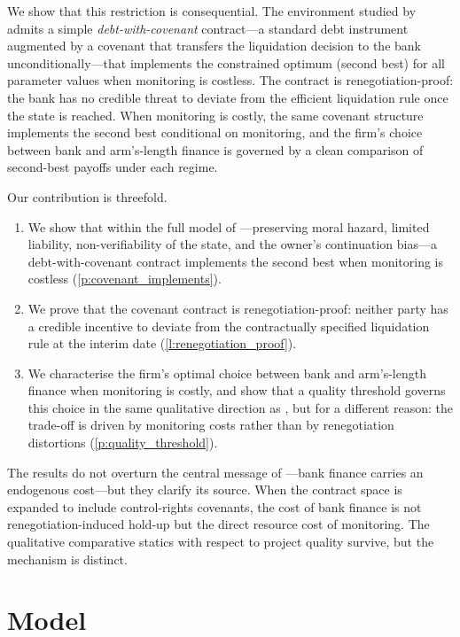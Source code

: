 \documentclass[12pt,a4paper]{article}
\theoremstyle{plain}
\theoremstyle{definition}
\theoremstyle{remark}
\begin{document}
We show that this restriction is consequential. The environment studied by
\citet{Rajan1992} admits a simple \emph{debt-with-covenant} contract---a standard
debt instrument augmented by a covenant that transfers the liquidation decision to the
bank unconditionally---that implements the constrained optimum (second best) for all
parameter values when monitoring is costless. The contract is renegotiation-proof: the
bank has no credible threat to deviate from the efficient liquidation rule once the state
is reached. When monitoring is costly, the same covenant structure implements the
second best conditional on monitoring, and the firm's choice between bank and
arm's-length finance is governed by a clean comparison of second-best payoffs under
each regime.

Our contribution is threefold.
\begin{enumerate}[nosep]
\item We show that within the full model of \citet{Rajan1992}---preserving moral
  hazard, limited liability, non-verifiability of the state, and the owner's
  continuation bias---a debt-with-covenant contract implements the second best when
  monitoring is costless (\cref{p:covenant_implements}).
\item We prove that the covenant contract is renegotiation-proof: neither party has a
  credible incentive to deviate from the contractually specified liquidation rule at
  the interim date (\cref{l:renegotiation_proof}).
\item We characterise the firm's optimal choice between bank and arm's-length finance
  when monitoring is costly, and show that a quality threshold governs this choice in
  the same qualitative direction as \citet{Rajan1992}, but for a different reason: the
  trade-off is driven by monitoring costs rather than by renegotiation distortions
  (\cref{p:quality_threshold}).
\end{enumerate}

The results do not overturn the central message of \citet{Rajan1992}---bank finance
carries an endogenous cost---but they clarify its source. When the contract space is
expanded to include control-rights covenants, the cost of bank finance is not
renegotiation-induced hold-up but the direct resource cost of monitoring. The
qualitative comparative statics with respect to project quality survive, but the
mechanism is distinct.

\section{Model}
\label{sec:model}
\end{document}
